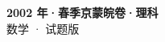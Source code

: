 \documentclass[zihao=-4, a4paper]{ctexart}
\begin{document}
\begin{center}
  {\Large\bfseries 2002 年·春季京蒙皖卷·理科}\\[4pt]
  {\large 数学 · 试题版}
\end{center}
\medskip
{}

\end{document}
